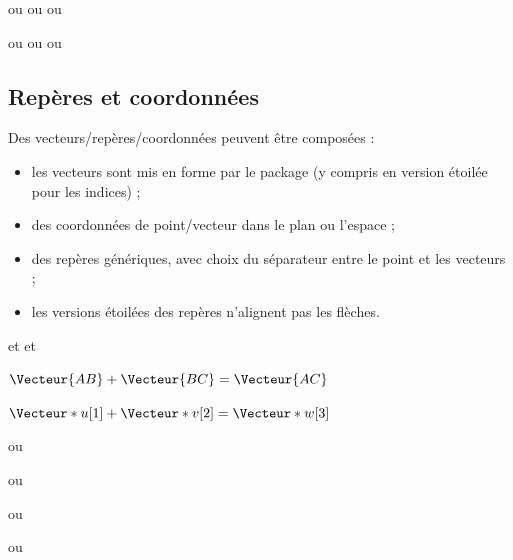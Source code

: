 \begin{PresCodeTexPL}{}
 ou  ou  ou 
\end{PresCodeTexPL}

\begin{PresCodeTexPL}{}
 ou  ou 
 ou 
\end{PresCodeTexPL}

\subsection{Repères et coordonnées}

\begin{tipblock}
Des vecteurs/repères/coordonnées peuvent être composées :

\begin{itemize}
	\item les vecteurs sont mis en forme par le package  (y compris en version étoilée pour les indices) ;
	\item des coordonnées de point/vecteur dans le plan ou l'espace ;
	\item des repères génériques, avec choix du séparateur entre le point et les vecteurs ;
	\item les versions étoilées des repères n'alignent pas les flèches.
\end{itemize}
\vspace*{-\baselineskip}\leavevmode
\end{tipblock}

\begin{PresCodeTexPL}{}
\Vecteur{\imath} et  et 

$\Vecteur{AB}+\Vecteur{BC} = \Vecteur{AC}$

$\Vecteur*{u}[1]+\Vecteur*{v}[2] = \Vecteur*{w}[3]$
\end{PresCodeTexPL}

\begin{PresCodeTexPL}{}
 ou 

 ou 
\end{PresCodeTexPL}

\begin{PresCodeTexPL}{}
 ou 

 ou 
\end{PresCodeTexPL}

